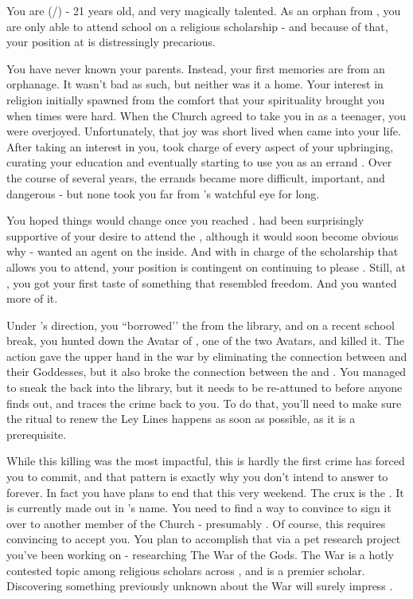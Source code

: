 \documentclass[char]{GL2020}
\begin{document}
\name{\cScholarship{}}

You are \cScholarship{} (\cScholarship{\they}/\cScholarship{\them}) - 21 years old, and very magically talented. As an orphan from \pTech{}, you are only able to attend school on a religious scholarship - and because of that, your position at \pSchool{} is distressingly precarious.

You have never known your parents. Instead, your first memories are from an orphanage. It wasn’t bad as such, but neither was it a home. Your interest in religion initially spawned from the comfort that your spirituality brought you when times were hard. When the Church agreed to take you in as a teenager, you were overjoyed. Unfortunately, that joy was short lived when \cAntiChup{} came into your life. After taking an interest in you, \cAntiChup{} took charge of every aspect of your upbringing, curating your education and eventually starting to use you as an errand \cScholarship{\kid}. Over the course of several years, the errands became more difficult, important, and dangerous - but none took you far from \cAntiChup{}’s watchful eye for long.

You hoped things would change once you reached \pSchool{}. \cAntiChup{} had been surprisingly supportive of your desire to attend the \pSc{}, although it would soon become obvious why - \cAntiChup{\they} wanted an agent on the inside. And with \cAntiChup{} in charge of the scholarship that allows you to attend, your position is contingent on continuing to please \cAntiChup{\them}. Still, at \pSchool{}, you got your first taste of something that resembled freedom. And you wanted more of it.

Under \cAntiChup{}’s direction, you ``borrowed’’ the \iNet{} from the \pSc{} library, and on a recent school break, you hunted down the Avatar of \cEbb{\full}, one of the two \pShip{} Avatars, and killed it. The action gave \pTech{} the upper hand in the war by eliminating the connection between \pShip{} and their Goddesses, but it also broke the connection between the \iNet{} and \pShip{}. You managed to sneak the \iNet{} back into the library, but it needs to be re-attuned to \pShip{} before anyone finds out, and traces the crime back to you. To do that, you’ll need to make sure the ritual to renew the Ley Lines happens as soon as possible, as it is a prerequisite.

While this killing was the most impactful, this is hardly the first crime \cAntiChup{} has forced you to commit, and that pattern is exactly why you don’t intend to answer to \cAntiChup{} forever. In fact you have plans to end that this very weekend. The crux is the \iScholarship{}. It is currently made out in \cAntiChup{}’s name. You need to find a way to convince \cAntiChup{} to sign it over to another member of the Church - presumably \cBeetle{}. Of course, this requires convincing \cBeetle{} to accept you. You plan to accomplish that via a pet research project you’ve been working on - researching The War of the Gods. The War is a hotly contested topic among religious scholars across \pEarth{}, and \cBeetle{} is a premier scholar. Discovering something previously unknown about the War will surely impress \cBeetle{\them}.
\end{document}
